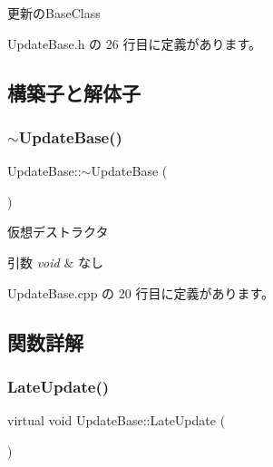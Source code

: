更新の\+Base\+Class 

 Update\+Base.\+h の 26 行目に定義があります。



\subsection{構築子と解体子}
\mbox{\label{class_update_base_a70fbdbeb1a3c9181d9e9190cd661907c}} 
\subsubsection{\texorpdfstring{$\sim$\+Update\+Base()}{~UpdateBase()}}
{\footnotesize\ttfamily Update\+Base\+::$\sim$\+Update\+Base (\begin{DoxyParamCaption}{ }\end{DoxyParamCaption})\hspace{0.3cm}{\ttfamily [pure virtual]}}



仮想デストラクタ 


\begin{DoxyParams}{引数}
{\em void} & なし \\
\hline
\end{DoxyParams}


 Update\+Base.\+cpp の 20 行目に定義があります。



\subsection{関数詳解}
\mbox{\label{class_update_base_afc4956f78135aed5fc4e4f9991be50b9}} 
\subsubsection{\texorpdfstring{Late\+Update()}{LateUpdate()}}
{\footnotesize\ttfamily virtual void Update\+Base\+::\+Late\+Update (\begin{DoxyParamCaption}{ }\end{DoxyParamCaption})\hspace{0.3cm}{\ttfamily [pure virtual]}}




